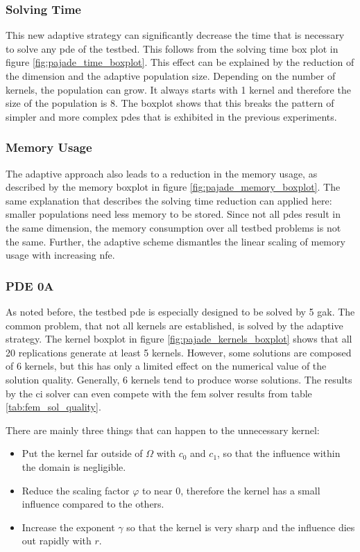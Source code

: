 \documentclass[./\jobname.tex]{subfiles}
\begin{document}
\subsubsection{Solving Time}

This new adaptive strategy can significantly decrease the time that is necessary to solve any \gls{pde} of the testbed. This follows from the solving time box plot in figure \ref{fig:pajade_time_boxplot}. This effect can be explained by the reduction of the dimension and the adaptive population size. Depending on the number of kernels, the population can grow. It always starts with 1 kernel and therefore the size of the population is 8. The boxplot shows that this breaks the pattern of simpler and more complex \gls{pde}s that is exhibited in the previous experiments.

\subsubsection{Memory Usage}
The adaptive approach also leads to a reduction in the memory usage, as described by the memory boxplot in figure \ref{fig:pajade_memory_boxplot}. The same explanation that describes the solving time reduction can applied here: smaller populations need less memory to be stored. Since not all \gls{pde}s result in the same dimension, the memory consumption over all testbed problems is not the same. Further, the adaptive scheme dismantles the linear scaling of memory usage with increasing \gls{nfe}. 

\subsubsection{PDE 0A}
\label{chap:ex2_discussion_pde0a}
As noted before, the testbed \gls{pde} is especially designed to be solved by 5 \gls{gak}. The common problem, that not all kernels are established, is solved by the adaptive strategy. The kernel boxplot in figure \ref{fig:pajade_kernels_boxplot} shows that all 20 replications generate at least 5 kernels. However, some solutions are composed of 6 kernels, but this has only a limited effect on the numerical value of the solution quality. Generally, 6 kernels tend to produce worse solutions. The results by the \gls{ci} solver can even compete with the \gls{fem} solver results from table \ref{tab:fem_sol_quality}.

There are mainly three things that can happen to the unnecessary kernel: 
\begin{itemize}
	\item Put the kernel far outside of $\Omega$ with $c_0$ and $c_1$, so that the influence within the domain is negligible.
	\item Reduce the scaling factor $\varphi$ to near 0, therefore the kernel has a small influence compared to the others.
	\item Increase the exponent $\gamma$ so that the kernel is very sharp and the influence dies out rapidly with $r$.
\end{itemize}
\end{document}
